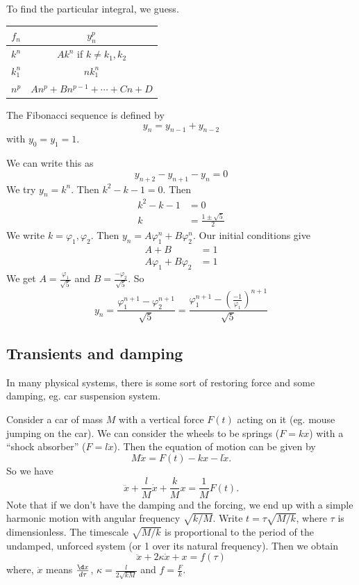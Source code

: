 \documentclass[a4paper]{article}
\begin{document}
To find the particular integral, we guess.
\begin{center}
  \begin{tabular}{cc}
    \toprule
    $f_n$ & $y_n^p$\\
    \midrule
    $k^n$ & $Ak^n$ if $k \not= k_1, k_2$\\
    $k_1^n$ & $nk_1^n$\\
    $n^p$ & $An^p + Bn^{p - 1} + \cdots + Cn + D$\\
    \bottomrule
  \end{tabular}
\end{center}

\begin{eg}
  The Fibonacci sequence is defined by
  \[
    y_n = y_{n - 1} + y_{n - 2}
  \]
  with $y_0 = y_1 = 1$.

  We can write this as
  \[
    y_{n + 2} - y_{n + 1} - y_n = 0
  \]
  We try $y_n = k^n$. Then $k^2 - k - 1 = 0$. Then
  \begin{align*}
    k^2 - k - 1 &= 0\\
    k &= \frac{1 \pm \sqrt{5}}{2}
  \end{align*}
  We write $k = \varphi_1, \varphi_2$. Then $y_n = A\varphi_1^n + B\varphi_2^n$. Our initial conditions give
  \begin{align*}
    A + B &= 1\\
    A\varphi_1 + B\varphi_2 &= 1
  \end{align*}
  We get $\displaystyle A = \frac{\varphi_1}{\sqrt{5}}$ and $\displaystyle B = \frac{-\varphi_2}{\sqrt{5}}$. So
  \[
    y_n = \frac{\varphi_1^{n + 1} - \varphi_2^{n + 1}}{\sqrt{5}} = \frac{\varphi_1^{n + 1} - \left(\frac{-1}{\varphi_1}\right)^{n + 1}}{\sqrt{5}}
  \]
\end{eg}

\subsection{Transients and damping}
In many physical systems, there is some sort of restoring force and some damping, eg. car suspension system.

Consider a car of mass $M$ with a vertical force $F(t)$ acting on it (eg. mouse jumping on the car). We can consider the wheels to be springs ($F = kx$) with a ``shock absorber'' ($F = l\dot x$). Then the equation of motion can be given by
\[
  M\ddot x = F(t) - kx - l\dot x.
\]
So we have
\[
  \ddot x + \frac{l}{M}\dot x + \frac{k}{M}x = \frac{1}{M}F(t).
\]
Note that if we don't have the damping and the forcing, we end up with a simple harmonic motion with angular frequency $\sqrt{k/M}$. Write $t = \tau \sqrt{M/k}$, where $\tau$ is dimensionless. The timescale $\sqrt{M/k}$ is proportional to the period of the undamped, unforced system (or 1 over its natural frequency). Then we obtain
\[
  \ddot x + 2\kappa\dot x + x = f(\tau)
\]
where, $\dot x$ means $\frac{\d x}{d\tau}$, $\kappa = \frac{l}{2\sqrt{kM}}$ and $f = \frac{F}{k}$.
\end{document}
